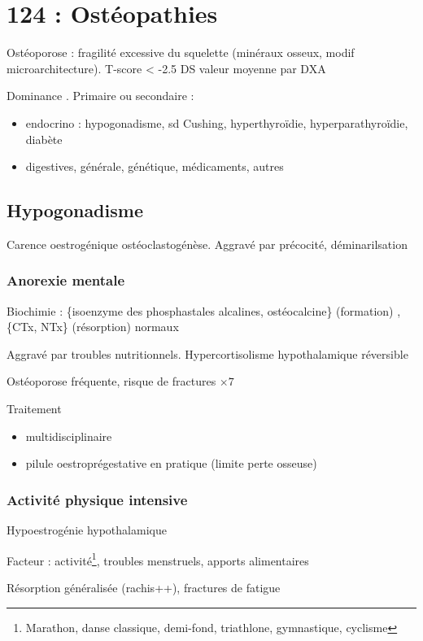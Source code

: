 \documentclass[11pt]{article}
\begin{document}
\section{124 : Ostéopathies}
\label{sec:orgde13a9b}
Ostéoporose : fragilité excessive du squelette (\dec minéraux osseux, modif
microarchitecture). T-score < -2.5 DS valeur moyenne par DXA

Dominance \female. Primaire ou secondaire :
\begin{itemize}
\item endocrino : hypogonadisme, sd Cushing, hyperthyroïdie, hyperparathyroïdie, diabète
\item digestives, générale, génétique, médicaments, autres
\end{itemize}

\subsection{Hypogonadisme}
\label{sec:org9619c1a}
Carence oestrogénique \inc ostéoclastogénèse. Aggravé par précocité,
déminarilsation
\subsubsection{Anorexie mentale}
\label{sec:orgad7c404}
Biochimie : \{isoenzyme des phosphastales alcalines, ostéocalcine\} (formation)
\dec, \{CTx, NTx\} (résorption) normaux

Aggravé par troubles nutritionnels. Hypercortisolisme hypothalamique réversible

Ostéoporose fréquente, risque de fractures \(\times 7\)

Traitement 
\begin{itemize}
\item multidisciplinaire
\item pilule oestroprégestative en pratique (limite perte osseuse)
\end{itemize}

\subsubsection{Activité physique intensive}
\label{sec:org51ce953}
Hypoestrogénie hypothalamique

Facteur : activité\footnote{Marathon, danse classique, demi-fond, triathlone, gymnastique, cyclisme}, troubles menstruels, apports alimentaires

Résorption généralisée (rachis++), \inc fractures de fatigue
\end{document}
